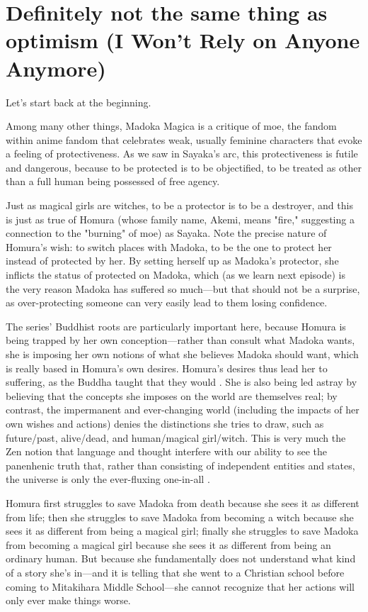 \chapter{Definitely not the same thing as optimism (I Won't Rely on Anyone Anymore)}
Let's start back at the beginning.

Among many other things, Madoka Magica is a critique of moe, the fandom within anime fandom that celebrates weak, usually feminine characters that evoke a feeling of protectiveness. As we saw in Sayaka's arc, this protectiveness is futile and dangerous, because to be protected is to be objectified, to be treated as other than a full human being possessed of free agency.

Just as magical girls are witches, to be a protector is to be a destroyer, and this is just as true of Homura (whose family name, Akemi, means "fire," suggesting a connection to the "burning" of moe) as Sayaka. Note the precise nature of Homura's wish: to switch places with Madoka, to be the one to protect her instead of protected by her. By setting herself up as Madoka's protector, she inflicts the status of protected on Madoka, which (as we learn next episode) is the very reason Madoka has suffered so much—but that should not be a surprise, as over-protecting someone can very easily lead to them losing confidence.

The series' Buddhist roots are particularly important here, because Homura is being trapped by her own conception—rather than consult what Madoka wants, she is imposing her own notions of what she believes Madoka should want, which is really based in Homura's own desires. Homura's desires thus lead her to suffering, as the Buddha taught that they would \cite{ref75}. She is also being led astray by believing that the concepts she imposes on the world are themselves real; by contrast, the impermanent and ever-changing world (including the impacts of her own wishes and actions) denies the distinctions she tries to draw, such as future/past, alive/dead, and human/magical girl/witch. This is very much the Zen notion that language and thought interfere with our ability to see the panenhenic truth that, rather than consisting of independent entities and states, the universe is only the ever-fluxing one-in-all \cite{ref76}. 

Homura first struggles to save Madoka from death because she sees it as different from life; then she struggles to save Madoka from becoming a witch because she sees it as different from being a magical girl; finally she struggles to save Madoka from becoming a magical girl because she sees it as different from being an ordinary human. But because she fundamentally does not understand what kind of a story she's in—and it is telling that she went to a Christian school before coming to Mitakihara Middle School—she cannot recognize that her actions will only ever make things worse.

